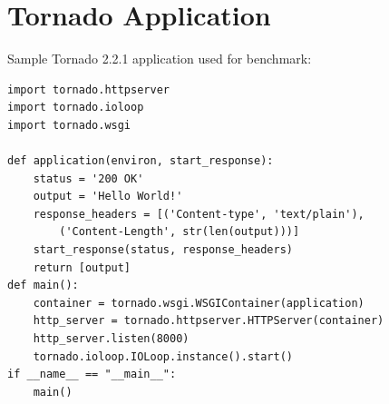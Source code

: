 \documentclass[11pt]{article}
\begin{document}
\section{Tornado Application}
Sample Tornado 2.2.1 application used for benchmark:
 \begin{verbatim}
import tornado.httpserver
import tornado.ioloop
import tornado.wsgi

def application(environ, start_response):
    status = '200 OK'
    output = 'Hello World!' 
    response_headers = [('Content-type', 'text/plain'),
        ('Content-Length', str(len(output)))]
    start_response(status, response_headers)
    return [output]
def main():
    container = tornado.wsgi.WSGIContainer(application)
    http_server = tornado.httpserver.HTTPServer(container)
    http_server.listen(8000)
    tornado.ioloop.IOLoop.instance().start()
if __name__ == "__main__":
    main()
 \end{verbatim}
\appendix
\end{document}

